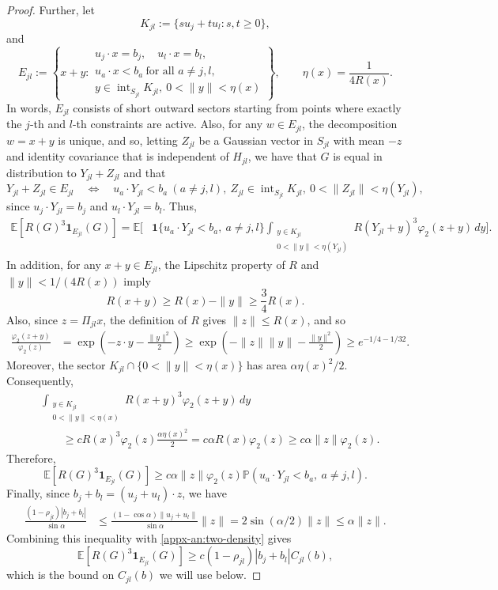 \documentclass[11pt,letterpaper]{article}
\theoremstyle{remark}
\newcommand{\E}{\mathbb E}
\newcommand{\Pp}{\mathbb P}
\newcommand{\ind}{\mathbf 1}
\begin{document}
\begin{proof}
Further, let
\[
K_{jl}:=\{s u_j+t u_l: s,t\ge0\},
\]
and
\[
E_{jl}:=\left\{
x+y:
\begin{array}{l}
u_j\cdot x=b_j,\quad u_l\cdot x=b_l,\\
u_a\cdot x<b_a\ \text{for all }a\ne j,l,\\
y\in\operatorname{int}_{S_{jl}}K_{jl},\
0<\|y\|<\eta(x)
\end{array}
\right\},
\qquad
\eta(x)=\frac1{4R(x)}.
\]
In words, \(E_{jl}\) consists of short outward sectors
starting from points where exactly the \(j\)-th and
\(l\)-th constraints are active. Also, for any $w\in E_{jl}$, the decomposition $w = x+y$ is unique, and so, letting \(Z_{jl}\) be a Gaussian vector in \(S_{jl}\)
with mean \(-z\) and identity covariance that is independent
of \(H_{jl}\), we have that $G$ is equal in distribution to \(Y_{jl}+Z_{jl}\) and that
\[
Y_{jl}+Z_{jl}\in E_{jl}
\quad\Longleftrightarrow\quad
u_a\cdot Y_{jl}<b_a\ (a\ne j,l),\
Z_{jl}\in \operatorname{int}_{S_{jl}}K_{jl},\
0<\|Z_{jl}\|<\eta(Y_{jl}),
\]
since $u_j\cdot Y_{jl} = b_j$ and $u_l\cdot Y_{jl} = b_l$. Thus,
\[
\begin{aligned}
\E[R(G)^3\ind_{E_{jl}}(G)]
=\E\bigg[
&\ind\{u_a\cdot Y_{jl}<b_a,\ a\ne j,l\}\int_{\substack{y\in K_{jl}\\
                 0<\|y\|<\eta(Y_{jl})}}
R(Y_{jl}+y)^3\varphi_2(z+y)\,dy
\bigg].
\end{aligned}
\]
In addition, for any
\(x+y\in E_{jl}\), the Lipschitz property of \(R\)
and \(\|y\|<1/(4R(x))\) imply
\[
R(x+y)\ge R(x)-\|y\|\ge\frac34R(x).
\]
Also, since \(z=\Pi_{jl}x\), the definition of \(R\)
gives \(\|z\|\le R(x)\), and so
\[
\begin{aligned}
\frac{\varphi_2(z+y)}{\varphi_2(z)}
&=\exp\left(-z\cdot y-\frac{\|y\|^2}{2}\right)\ge\exp\left(-\|z\|\|y\|-\frac{\|y\|^2}{2}\right)
\ge e^{-1/4-1/32}.
\end{aligned}
\]
Moreover, the sector \(K_{jl}\cap\{0<\|y\|<\eta(x)\}\)
has area \(\alpha\eta(x)^2/2\). Consequently,
\[
\begin{aligned}
&\int_{\substack{y\in K_{jl}\\
                 0<\|y\|<\eta(x)}}
R(x+y)^3\varphi_2(z+y)\,dy\\
&\qquad\ge
cR(x)^3\varphi_2(z)\frac{\alpha\eta(x)^2}{2}
=c\alpha R(x)\varphi_2(z)
\ge c\alpha\|z\|\varphi_2(z).
\end{aligned}
\]
Therefore,
\[
\E[R(G)^3\ind_{E_{jl}}(G)]
\ge c\alpha\|z\|\varphi_2(z)
\Pp(u_a\cdot Y_{jl}<b_a,\ a\ne j,l).
\]
Finally, since \(b_j+b_l=(u_j+u_l)\cdot z\), we have
\[
\begin{aligned}
\frac{(1-\rho_{jl})|b_j+b_l|}{\sin\alpha}
&\le
\frac{(1-\cos\alpha)\|u_j+u_l\|}{\sin\alpha}
\|z\| =2\sin(\alpha/2)\|z\|
\le\alpha\|z\|.
\end{aligned}
\]
Combining this inequality with
\eqref{appx-an:two-density} gives
\begin{equation}
\E[R(G)^3\ind_{E_{jl}}(G)]
\ge c(1-\rho_{jl})|b_j+b_l|C_{jl}(b),
\label{appx-an:two-region}
\end{equation}
which is the bound on $C_{jl}(b)$ we will use below.





\end{proof}
\end{document}
